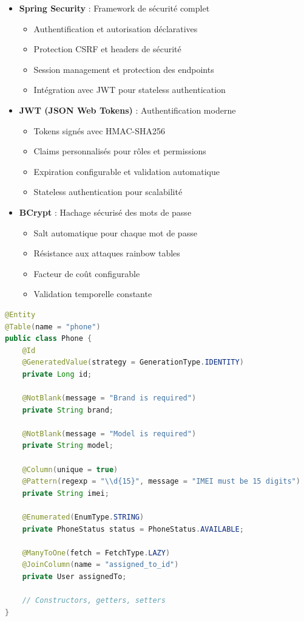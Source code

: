 \documentclass[12pt,a4paper]{report}
\begin{document}
\begin{itemize}
\item \textbf{Spring Security} : Framework de sécurité complet
  \begin{itemize}
  \item Authentification et autorisation déclaratives
  \item Protection CSRF et headers de sécurité
  \item Session management et protection des endpoints
  \item Intégration avec JWT pour stateless authentication
  \end{itemize}

\item \textbf{JWT (JSON Web Tokens)} : Authentification moderne
  \begin{itemize}
  \item Tokens signés avec HMAC-SHA256
  \item Claims personnalisés pour rôles et permissions
  \item Expiration configurable et validation automatique
  \item Stateless authentication pour scalabilité
  \end{itemize}

\item \textbf{BCrypt} : Hachage sécurisé des mots de passe
  \begin{itemize}
  \item Salt automatique pour chaque mot de passe
  \item Résistance aux attaques rainbow tables
  \item Facteur de coût configurable
  \item Validation temporelle constante
  \end{itemize}
\end{itemize}

\begin{lstlisting}[language=Java, caption=Exemple d'entité JPA avec validation]
@Entity
@Table(name = "phone")
public class Phone {
    @Id
    @GeneratedValue(strategy = GenerationType.IDENTITY)
    private Long id;
    
    @NotBlank(message = "Brand is required")
    private String brand;
    
    @NotBlank(message = "Model is required")  
    private String model;
    
    @Column(unique = true)
    @Pattern(regexp = "\\d{15}", message = "IMEI must be 15 digits")
    private String imei;
    
    @Enumerated(EnumType.STRING)
    private PhoneStatus status = PhoneStatus.AVAILABLE;
    
    @ManyToOne(fetch = FetchType.LAZY)
    @JoinColumn(name = "assigned_to_id")
    private User assignedTo;
    
    // Constructors, getters, setters
}
\end{lstlisting}
\end{document}
